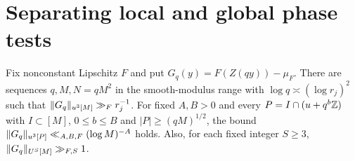 \section{Separating local and global phase tests}

\begin{proposition}\label{p:separating-family}
\leanok
{}
Fix nonconstant Lipschitz $F$ and put $G_q(y)=F(Z(qy))-\mu_F$.
There are sequences $q,M,N=qM^2$ in the smooth-modulus range
with $\log q\asymp(\log r_j)^2$ such that
$\lVert G_q\rVert_{u^3[M]}\gg_F r_j^{-1}$.
For fixed $A,B>0$ and every $P=I\cap(u+q^b\mathbb Z)$ with
$I\subset[M]$, $0\le b\le B$ and $|P|\ge(qM)^{1/2}$, the
bound $\lVert G_q\rVert_{u^3[P]}\ll_{A,B,F}(\log M)^{-A}$ holds.
Also, for each fixed integer $S\ge3$, $\lVert G_q\rVert_{U^S[M]}\gg_{F,S}1$.
\end{proposition}
